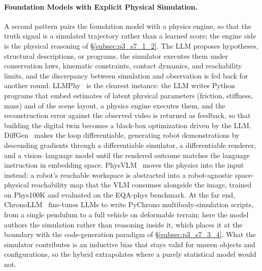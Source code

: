 \paragraph{Foundation Models with Explicit Physical Simulation.}
A second pattern pairs the foundation model with a physics engine, so that the truth signal is a simulated trajectory rather than a learned score; the engine side is the physical reasoning of §\ref{subsec:p3_s7_1_2}.
The LLM proposes hypotheses, structural descriptions, or programs, the simulator executes them under conservation laws, kinematic constraints, contact dynamics, and reachability limits, and the discrepancy between simulation and observation is fed back for another round.
LLMPhy~\cite{cherian2024llmphy} is the clearest instance: the LLM writes Python programs that embed estimates of latent physical parameters (friction, stiffness, mass) and of the scene layout, a physics engine executes them, and the reconstruction error against the observed video is returned as feedback, so that building the digital twin becomes a black-box optimization driven by the LLM.
DiffGen~\cite{jin2024diffgen} makes the loop differentiable, generating robot demonstrations by descending gradients through a differentiable simulator, a differentiable renderer, and a vision--language model until the rendered outcome matches the language instruction in embedding space.
PhysVLM~\cite{zhou2025physvlm} moves the physics into the input instead: a robot's reachable workspace is abstracted into a robot-agnostic space-physical reachability map that the VLM consumes alongside the image, trained on Phys100K and evaluated on the EQA-phys benchmark.
At the far end, ChronoLLM~\cite{wang2025chronollm} fine-tunes LLMs to write PyChrono multibody-simulation scripts, from a single pendulum to a full vehicle on deformable terrain; here the model authors the simulation rather than reasoning inside it, which places it at the boundary with the code-generation paradigm of §\ref{subsec:p3_s7_3_4}.
What the simulator contributes is an inductive bias that stays valid for unseen objects and configurations, so the hybrid extrapolates where a purely statistical model would not.

